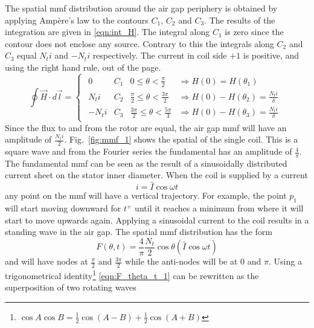 The spatial mmf distribution around the air gap periphery is obtained by applying Amp\`ere's law to the contours $C_1$, $C_2$ and $C_3$. The results of the integration are given in \eqref{eqn:int_H}. The integral along $C_1$ is zero since the contour does not enclose any source. Contrary to this the integrals along $C_2$ and $C_3$ equal $N_ti$ and $-N_ti$ respectively. The current in coil side $+1$ is positive, and using the right hand rule, out of the page.  
\begin{equation}
 \label{eqn:int_H}
 \oint \vec{H} \cdot d\vec{l}=
 \begin{cases}
   \begin{array}{llll}
     0  & C_1 & 0 \leq \theta < \frac{\pi}{2} 
     & \Rightarrow H(0)=H(\theta_1)\\
     N_ti & C_2 & \frac{\pi}{2} \leq \theta < \frac{3\pi}{2} 
     & \Rightarrow H(0)-H(\theta_2) = \frac{N_ti}{\delta} \\
     -N_ti & C_3 & \frac{3\pi}{2} \leq \theta < \frac{5\pi}{3} 
     & \Rightarrow H(0)-H(\theta_3) = \frac{N_ti}{\delta}
   \end{array}
 \end{cases}
\end{equation}
Since the flux to and from the rotor are equal, the air gap mmf will have an amplitude of $\frac{N_ti}{2}$. Fig.~\ref{fig:mmf_1} shows the spatial of the single coil. This is a square wave and from the Fourier series the fundamental has an amplitude of $\frac{4}{\pi}$. The fundamental mmf can be seen as the result of a sinusoidally distributed current sheet on the stator inner diameter. When the coil is supplied by a current 
\begin{equation}
  i = \hat{I}\cos\omega t
\end{equation}
any point on the mmf will have a vertical trajectory. For example, the point $p_1$ will start moving downward for $t^+$ until it reaches a minimum from where it will start to move upwards again. Applying a sinusoidal current to the coil results in a standing wave in the air gap. The spatial mmf distribution has the form
\begin{equation}
  \label{eqn:F_theta_t_1}
  F(\theta,t) = \frac{4}{\pi}\frac{N_t }{2}\cos\theta \left(\hat{I}\cos \omega t\right)
\end{equation}
and will have nodes at $\frac{\pi}{2}$ and $\frac{3\pi}{2}$ while the anti-nodes will be at $0$ and $\pi$. Using a trigonometrical identity\footnote{$\cos A \cos B = \frac{1}{2}\cos(A-B)+\frac{1}{2}\cos(A+B)$} \eqref{eqn:F_theta_t_1} can be rewritten as the superposition of two rotating waves

